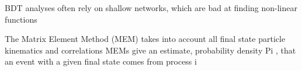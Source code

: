 BDT analyses often rely on shallow networks, which are bad at finding non-linear functions

The Matrix Element Method (MEM) takes into account all final state particle kinematics and correlations
MEMs give an estimate, probability density Pi , that an event with a given final state comes from process i

\begin{comment}
Table~\ref{tab:FinalYields} clearly shows that the total signal, in every channel, is smaller than even the statistical uncertainty of the background.
A cut and count experiment will not lead to any significant results.
The previous \HWWlnujj analyses have performed a fit to sensitive distributions like the 4-body mass, the mass of the two jet plus lepton plus \ETslash system.
However, this approach only includes a small amount of information available, leaving out additional sensitive kinematic distributions.
It is also felt that a BDT analysis using only kinematic variable would be sub-optimal because shallow classifiers are not robust against non-linear correlations and are only as good as the input variables.


\end{comment}
